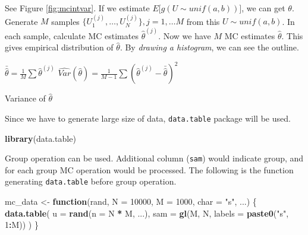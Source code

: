 \documentclass[]{book}
\newenvironment{Shaded}{\begin{snugshade}}{\end{snugshade}}
\newcommand{\ControlFlowTok}[1]{\textcolor[rgb]{0.13,0.29,0.53}{\textbf{#1}}}
\newcommand{\DataTypeTok}[1]{\textcolor[rgb]{0.13,0.29,0.53}{#1}}
\newcommand{\DecValTok}[1]{\textcolor[rgb]{0.00,0.00,0.81}{#1}}
\newcommand{\KeywordTok}[1]{\textcolor[rgb]{0.13,0.29,0.53}{\textbf{#1}}}
\newcommand{\NormalTok}[1]{#1}
\newcommand{\OperatorTok}[1]{\textcolor[rgb]{0.81,0.36,0.00}{\textbf{#1}}}
\newcommand{\StringTok}[1]{\textcolor[rgb]{0.31,0.60,0.02}{#1}}
\theoremstyle{definition}
\theoremstyle{definition}
\theoremstyle{definition}
\theoremstyle{remark}
\begin{document}
See Figure \ref{fig:mcintvar}. If we estimate \(E\Big[g(U \sim unif(a, b))\Big]\), we can get \(\theta\). Generate \(M\) samples \(\{ U_1^{(j)}, \ldots, U_N^{(j)} \}, j = 1, \ldots M\) from this \(U \sim unif(a, b)\). In each sample, calculate MC estimates \(\hat\theta^{(j)}\). Now we have \(M\) MC estimates \(\hat\theta\). This gives empirical distribution of \(\hat\theta\). By \emph{drawing a histogram}, we can see the outline.

\begin{algorithm}[H] \label{alg:algmcint}
  \SetAlgoLined
  $\bar{\hat\theta} = \frac{1}{M} \sum \hat\theta^{(j)}$\;
  $\widehat{Var}(\hat\theta) = \frac{1}{M - 1} \sum (\hat\theta^{(j)} - \bar{\hat\theta})^2$\;
  \caption{Variance of $\hat\theta$}
\end{algorithm}

Since we have to generate large size of data, \texttt{data.table} package will be used.

\begin{Shaded}
\begin{Highlighting}[]
\KeywordTok{library}\NormalTok{(data.table)}
\end{Highlighting}
\end{Shaded}

Group operation can be used. Additional column (\texttt{sam}) would indicate group, and for each group MC operation would be processed. The following is the function generating \texttt{data.table} before group operation.

\begin{Shaded}
\begin{Highlighting}[]
\NormalTok{mc_data <-}\StringTok{ }\ControlFlowTok{function}\NormalTok{(rand, }\DataTypeTok{N =} \DecValTok{10000}\NormalTok{, }\DataTypeTok{M =} \DecValTok{1000}\NormalTok{, }\DataTypeTok{char =} \StringTok{"s"}\NormalTok{, ...) \{}
  \KeywordTok{data.table}\NormalTok{(}
    \DataTypeTok{u =} \KeywordTok{rand}\NormalTok{(}\DataTypeTok{n =}\NormalTok{ N }\OperatorTok{*}\StringTok{ }\NormalTok{M, ...),}
    \DataTypeTok{sam =} \KeywordTok{gl}\NormalTok{(M, N, }\DataTypeTok{labels =} \KeywordTok{paste0}\NormalTok{(}\StringTok{"s"}\NormalTok{, }\DecValTok{1}\OperatorTok{:}\NormalTok{M))}
\NormalTok{  )}
\NormalTok{\}}
\end{Highlighting}
\end{Shaded}
\end{document}
